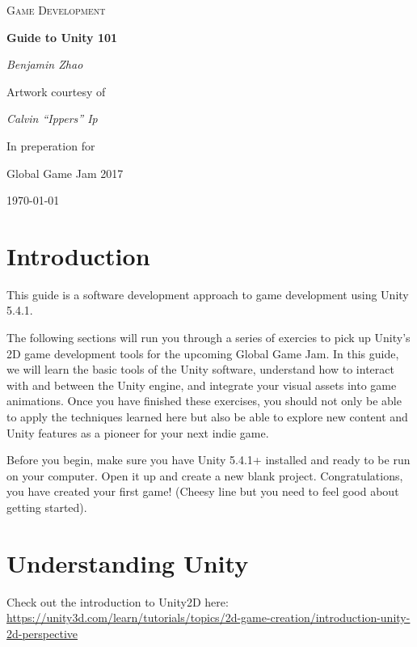 \documentclass[12pt]{article}
\begin{document}
\begin{titlepage}
	\centering
	\vspace{4cm}
	{\scshape\Large Game Development\par}
	\vspace{6.5cm}
	{\huge\bfseries Guide to Unity 101\par}
	\vspace{2cm}
	{\Large\itshape Benjamin Zhao\par}
	\vfill
	Artwork courtesy of\par
	{\itshape Calvin ``Ippers'' Ip\par}
  \vfill
	In preperation for\par
	Global Game Jam 2017\par
	\vspace{2cm}
	
	{\large \today\par}
\end{titlepage}

\newpage
\section{Introduction}

This guide is a software development approach to game development using Unity 5.4.1. 

The following sections will run you through a series of exercies to pick up Unity's 2D game development tools for the upcoming Global Game Jam. In this guide, we will learn the basic tools of the Unity software, understand how to interact with and between the Unity engine, and integrate your visual assets into game animations. Once you have finished these exercises, you should not only be able to apply the techniques learned here but also be able to explore new content and Unity features as a pioneer for your next indie game. 

Before you begin, make sure you have Unity 5.4.1+ installed and ready to be run on your computer. Open it up and create a new blank project. Congratulations, you have created your first game! (Cheesy line but you need to feel good about getting started). 

\section{Understanding Unity}

Check out the introduction to Unity2D here: \url{https://unity3d.com/learn/tutorials/topics/2d-game-creation/introduction-unity-2d-perspective}
\end{document}
